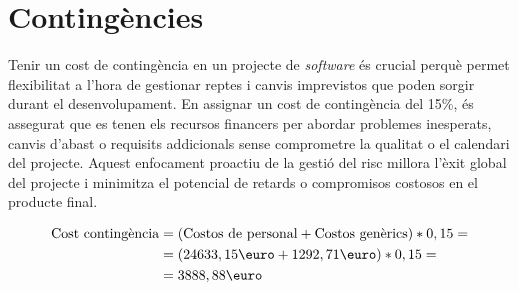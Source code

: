 \section{Contingències}
Tenir un cost de contingència en un projecte de \textit{software} és crucial perquè permet flexibilitat a l'hora de gestionar reptes i canvis imprevistos que poden sorgir durant el desenvolupament. En assignar un cost de contingència del 15\%, és assegurat que es tenen els recursos financers per abordar problemes inesperats, canvis d'abast o requisits addicionals sense comprometre la qualitat o el calendari del projecte. Aquest enfocament proactiu de la gestió del risc millora l'èxit global del projecte i minimitza el potencial de retards o compromisos costosos en el producte final.


\begin{align*}
\text{Cost contingència} & = (\text{Costos de personal} + \text{Costos genèrics}) * 0,15 = \\
& = (24633,15\text{\euro} + 1292,71\text{\euro}) * 0,15 = \\
& =3888,88\text{\euro}
\end{align*}

